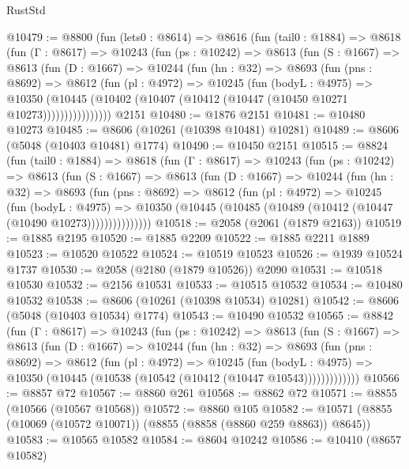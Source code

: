 \begin{lexlean}{RustStd}
\begin{coremodule}
@10479 := @8800
    (fun (lets0 : @8614) =>
    @8616
      (fun (tail0 : @1884) =>
      @8618
        (fun (Γ : @8617) =>
        @10243
          (fun (ps : @10242) =>
          @8613
            (fun (S : @1667) =>
            @8613
              (fun (D : @1667) =>
              @10244
                (fun (hn : @32) =>
                @8693
                  (fun (pns : @8692) =>
                  @8612
                    (fun (pl : @4972) =>
                    @10245
                      (fun (bodyL : @4975) =>
                      @10350
                        (@10445
                          (@10402 (@10407 (@10412 (@10447 (@10450 @10271 @10273))))))))))))))))
    @2151
@10480 := @1876 @2151
@10481 := @10480 @10273
@10485 := @8606 (@10261 (@10398 @10481) @10281)
@10489 := @8606 (@5048 (@10403 @10481) @1774)
@10490 := @10450 @2151
@10515 := @8824
    (fun (tail0 : @1884) =>
    @8618
      (fun (Γ : @8617) =>
      @10243
        (fun (ps : @10242) =>
        @8613
          (fun (S : @1667) =>
          @8613
            (fun (D : @1667) =>
            @10244
              (fun (hn : @32) =>
              @8693
                (fun (pns : @8692) =>
                @8612
                  (fun (pl : @4972) =>
                  @10245
                    (fun (bodyL : @4975) =>
                    @10350 (@10445 (@10485 (@10489 (@10412 (@10447 (@10490 @10273)))))))))))))))
@10518 := @2058 (@2061 (@1879 @2163))
@10519 := @1885 @2195
@10520 := @1885 @2209
@10522 := @1885 @2211 @1889
@10523 := @10520 @10522
@10524 := @10519 @10523
@10526 := @1939 @10524 @1737
@10530 := @2058 (@2180 (@1879 @10526)) @2090
@10531 := @10518 @10530
@10532 := @2156 @10531
@10533 := @10515 @10532
@10534 := @10480 @10532
@10538 := @8606 (@10261 (@10398 @10534) @10281)
@10542 := @8606 (@5048 (@10403 @10534) @1774)
@10543 := @10490 @10532
@10565 := @8842
    (fun (Γ : @8617) =>
    @10243
      (fun (ps : @10242) =>
      @8613
        (fun (S : @1667) =>
        @8613
          (fun (D : @1667) =>
          @10244
            (fun (hn : @32) =>
            @8693
              (fun (pns : @8692) =>
              @8612
                (fun (pl : @4972) =>
                @10245
                  (fun (bodyL : @4975) =>
                  @10350 (@10445 (@10538 (@10542 (@10412 (@10447 @10543)))))))))))))
@10566 := @8857 @72
@10567 := @8860 @261
@10568 := @8862 @72
@10571 := @8855 (@10566 (@10567 @10568))
@10572 := @8860 @105
@10582 := @10571 (@8855 (@10069 (@10572 @10071)) (@8855 (@8858 (@8860 @259 @8863)) @8645))
@10583 := @10565 @10582
@10584 := @8604 @10242
@10586 := @10410 (@8657 @10582)

\end{coremodule}
\end{lexlean}
